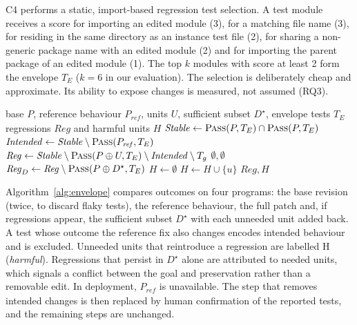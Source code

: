 \documentclass[a4paper,fleqn]{cas-sc}
\newcommand{\lab}[1]{\textsf{#1}}
\begin{document}
C4 performs a static, import-based regression test selection. A test module receives a score for importing an edited module (3), for a matching file name (3), for residing in the same directory as an instance test file (2), for sharing a non-generic package name with an edited module (2) and for importing the parent package of an edited module (1). The top $k$ modules with score at least 2 form the envelope $T_E$ ($k=6$ in our evaluation). The selection is deliberately cheap and approximate. Its ability to expose changes is measured, not assumed (RQ3).

\begin{algorithm}[t]
\caption{Preservation envelope and attribution (C4)}\label{alg:envelope}
\begin{algorithmic}[1]
\Require base $P$, reference behaviour $P_{\mathit{ref}}$, units $U$, sufficient subset $D^\star$, envelope tests $T_E$
\Ensure regressions $\mathit{Reg}$ and harmful units $H$
\State $\mathit{Stable} \gets \Call{Pass}{P, T_E} \cap \Call{Pass}{P, T_E}$ 
\State $\mathit{Intended} \gets \mathit{Stable}\setminus\Call{Pass}{P_{\mathit{ref}}, T_E}$ 
\State $\mathit{Reg} \gets \mathit{Stable}\setminus\Call{Pass}{P\oplus U, T_E}\setminus\mathit{Intended}\setminus T_g$
 \Return $\emptyset, \emptyset$ \EndIf
\State $\mathit{Reg}_{D} \gets \mathit{Reg}\setminus\Call{Pass}{P\oplus D^\star, T_E}$ 
\State $H \gets \emptyset$
   $H\gets H\cup\{u\}$ \EndIf
\EndFor
\State \Return $\mathit{Reg}, H$
\end{algorithmic}
\end{algorithm}

Algorithm~\ref{alg:envelope} compares outcomes on four programs: the base revision (twice, to discard flaky tests), the reference behaviour, the full patch and, if regressions appear, the sufficient subset $D^\star$ with each unneeded unit added back. A test whose outcome the reference fix also changes encodes intended behaviour and is excluded. Unneeded units that reintroduce a regression are labelled \lab{H} (\emph{harmful}). Regressions that persist in $D^\star$ alone are attributed to needed units, which signals a conflict between the goal and preservation rather than a removable edit. In deployment, $P_{\mathit{ref}}$ is unavailable. The step that removes intended changes is then replaced by human confirmation of the reported tests, and the remaining steps are unchanged.
\end{document}

